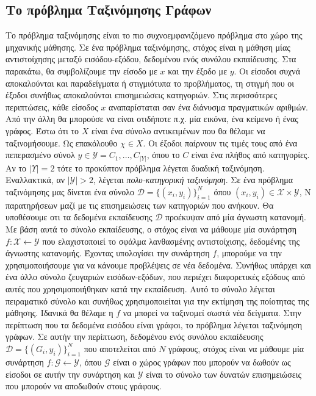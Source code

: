 \subsection{Το πρόβλημα Ταξινόμησης Γράφων}Το πρόβλημα ταξινόμησης είναι το πιο συχνοεμφανιζόμενο πρόβλημα στο χώρο της μηχανικής μάθησης.
\label{subsection:graph_classification}
Σε ένα πρόβλημα ταξινόμησης, στόχος είναι η μάθηση μίας αντιστοίχησης μεταξύ εισόδου-εξόδου, δεδομένου ενός συνόλου εκπαίδευσης.
Στα παρακάτω, θα συμβολίζουμε την είσοδο με $x$ και την έξοδο με $y$.
Οι είσοδοι συχνά αποκαλούνται και παραδείγματα ή στιγμιότυπα το προβλήματος, τη στιγμή που οι έξοδοι συνήθως αποκαλούνται επισημειώσεις κατηγοριών.
Στις περισσότερες περιπτώσεις, κάθε είσοδος $x$ αναπαρίσταται σαν ένα διάνυσμα πραγματικών αριθμών.
Από την άλλη θα μπορούσε να είναι οτιδήποτε π.χ. μία εικόνα, ένα κείμενο ή ένας γράφος.
Έστω ότι το $\mathcal{Χ}$ είναι ένα σύνολο αντικειμένων που θα θέλαμε να ταξινομήσουμε.
Ως επακόλουθο $χ \in \mathcal{Χ}$.
Οι έξοδοι παίρνουν τις τιμές τους από ένα πεπερασμένο σύνολ $y \in \mathcal{Y} = {C_{1}, \dots, C_{|Y|}}$, όπου το $C$ είναι ένα πλήθος από κατηγορίες.
Αν το $|\mathcal{Υ}| = 2$ τότε το προκύπτον πρόβλημα λέγεται δυαδική ταξινόμηση.
Εναλλακτικά, αν $|\mathcal{Y}| > 2$, λέγεται \textit{πολυ-κατηγορική ταξινόμηση}.
Σε ένα πρόβλημα ταξινόμησης μας δίνεται ένα σύνολο $\mathcal{D} = \{(x_{i}, y_{i})\}^{N}_{i=1}$ όπου $(x_{i}, y_{i}) \in \mathcal{X} \times \mathcal{Y}$, Ν παρατηρήσεων μαζί με τις επισημειώσεις των κατηγοριών που ανήκουν.
Θα υποθέσουμε οτι τα δεδομένα εκπαίδευσης $\mathcal{D}$ προέκυψαν από μία άγνωστη κατανομή.
Με βάση αυτά το σύνολο εκπαίδευσης, ο στόχος είναι να μάθουμε μία συνάρτηση $f: \mathcal{X} \leftarrow \mathcal{Y}$ που ελαχιστοποιεί το σφάλμα λανθασμένης αντιστοίχισης, δεδομένης της άγνωστης κατανομής.
Έχοντας υπολογίσει την συνάρτηση $f$, μπορούμε να την χρησιμοποιήσουμε για να κάνουμε προβλέψεις σε νέα δεδομένα.
Συνήθως υπάρχει και ένα άλλο σύνολο ζευγαριών εισόδων-εξόδων, που περιέχει διαφορετικές εξόδους από αυτές που χρησιμοποιήθηκαν κατά την εκπαίδευση.
Αυτό το σύνολο λέγεται πειραματικό σύνολο και συνήθως χρησιμοποιείται για την εκτίμηση της ποίοτητας της μάθησης.
Ιδανικά θα θέλαμε η $f$ να μπορεί να ταξινομεί σωστά νέα δείγματα.
Στην περίπτωση που τα δεδομένα εισόδου είναι γράφοι, το πρόβλημα λέγεται ταξινόμηση γράφων.
Σε αυτήν την περίπτωση, δεδομένου ενός συνόλου εκπαίδευσης $\mathcal{D} = \{(G_{i}, y_{i})\}^{N}_{i=1}$ που αποτελείται από $N$ γράφους, στόχος είναι να μάθουμε μία συνάρτηση $f: \mathcal{G} \leftarrow \mathcal{Y}$, όπου $\mathcal{G}$ είναι ο χώρος γράφων που μπορούν να δωθούν ως είσοδοι σε αυτήν την συνάρτηση και $\mathcal{Y}$ είναι το σύνολο των δυνατών επισημειώσεις που μπορούν να αποδωθούν στους γράφους.
